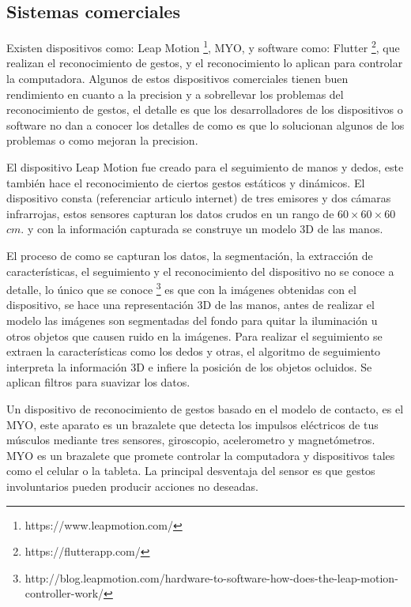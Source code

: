 \subsection{Sistemas comerciales}

Existen dispositivos como: Leap Motion \footnote{https://www.leapmotion.com/}, MYO, y software como: Flutter \footnote{https://flutterapp.com/}, que realizan el reconocimiento de gestos, y el reconocimiento lo aplican  para controlar la computadora. Algunos de estos dispositivos comerciales tienen  buen rendimiento en cuanto a la precision y a sobrellevar los problemas del reconocimiento de gestos, el detalle es que los desarrolladores de los dispositivos o software no dan a conocer los detalles de como es que lo solucionan algunos de los problemas o como mejoran la precision.
 
El dispositivo Leap Motion fue creado para el seguimiento de manos y dedos, este también hace el reconocimiento de ciertos gestos estáticos y dinámicos. El dispositivo consta (referenciar articulo internet) de tres emisores y dos cámaras infrarrojas, estos sensores capturan los datos crudos en un rango de $60 \times 60 \times 60$ $cm.$ y con la información capturada se construye un modelo 3D de las manos. 

El proceso de como se capturan los datos, la segmentación, la extracción de características, el seguimiento y el reconocimiento del dispositivo no se conoce a detalle, lo único que se conoce \footnote{http://blog.leapmotion.com/hardware-to-software-how-does-the-leap-motion-controller-work/} es que con la imágenes obtenidas con el dispositivo, se hace una representación 3D de las manos, antes de realizar el modelo las imágenes son segmentadas del fondo para quitar la iluminación u otros objetos que causen ruido en la imágenes.
Para realizar el seguimiento se extraen la características como los dedos y otras, el algoritmo de seguimiento interpreta la información 3D e infiere la posición de los objetos ocluidos. Se aplican filtros para suavizar los datos. 

Un dispositivo de reconocimiento de gestos basado en el modelo de contacto, es el MYO, este aparato es un brazalete que detecta los impulsos eléctricos de tus músculos mediante tres sensores, giroscopio, acelerometro y magnetómetros.
MYO es un brazalete que promete controlar la computadora y dispositivos tales como el celular o la tableta. La principal desventaja del sensor es que gestos involuntarios pueden producir acciones no deseadas. 

